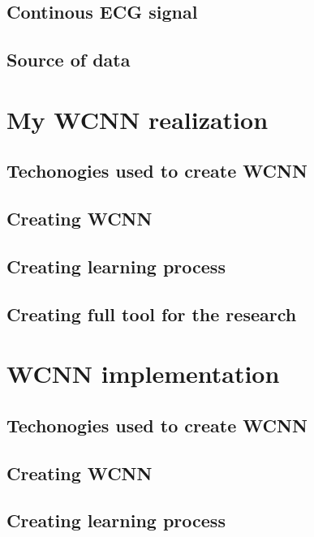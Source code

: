 \documentclass[12pt, a4paper, twoside]{scrartcl}
\begin{document}
\subsection{Continous \ac{ECG} signal}

\subsection{Source of data}

\clearpage


\section{My \ac{WCNN} realization}

\subsection{Techonogies used to create \ac{WCNN}}

\subsection{Creating \ac{WCNN}}

\subsection{Creating learning process}

\subsection{Creating full tool for the research}

\clearpage


\section{\ac{WCNN} implementation}

\subsection{Techonogies used to create \ac{WCNN}}

\subsection{Creating \ac{WCNN}}

\subsection{Creating learning process}
\end{document}
